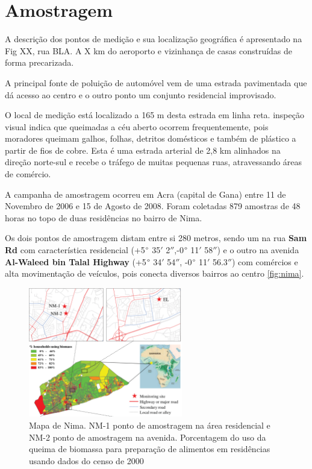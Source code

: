 \section{Amostragem}


A descrição dos pontos de medição e sua localização geográfica é apresentado 
na Fig XX, rua BLA. 
A X km do aeroporto e vizinhança de casas construídas de forma precarizada.

A principal fonte de poluição de automóvel vem de uma estrada pavimentada que 
dá acesso ao centro e o outro ponto um conjunto residencial improvisado.

O local de medição está localizado a 165 m desta estrada em linha reta. 
inspeção visual indica que queimadas a céu aberto ocorrem frequentemente, 
pois moradores queimam galhos, folhas, detritos domésticos e também de plástico 
a partir de fios de cobre. 
Esta é uma estrada arterial de 2,8 km alinhados na direção norte-sul e recebe o 
tráfego de muitas pequenas ruas, atravessando áreas de comércio. 

A campanha de amostragem ocorreu em Acra (capital de Gana) 
entre 11 de Novembro de 2006 e 15 de Agosto de 2008. 
Foram coletadas 879 amostras de 48 horas no topo de duas residências 
no bairro de Nima.

Os dois pontos de amostragem distam entre si 280 metros, sendo um na rua
\textbf{Sam Rd} com característica residencial
(+5$\degree$ 35$'$ 2$''$,-0$\degree$ 11$'$ 58$''$)
e o outro na avenida \textbf{Al-Waleed bin Talal Highway} 
(+5$\degree$ 34$'$ 54$''$, -0$\degree$ 11$'$ 56.3$''$) com comércios e
alta movimentação de veículos, pois conecta diversos bairros ao centro
\ref{fig:nima}. 

\begin{figure}[H]
\begin{center}
  \includegraphics[width=0.6\textwidth]{../inputs/images/zheng/nima_mapa.pdf}
  \caption{Mapa de Nima. NM-1 ponto de amostragem na área residencial e 
           NM-2 ponto de amostragem na avenida. Porcentagem do uso da queima
           de biomassa para preparação de alimentos em residências usando dados
           do censo de 2000 \citep{ghanacensus2003} \label{fig:nima_mapa}}
\end{center}
\end{figure}

